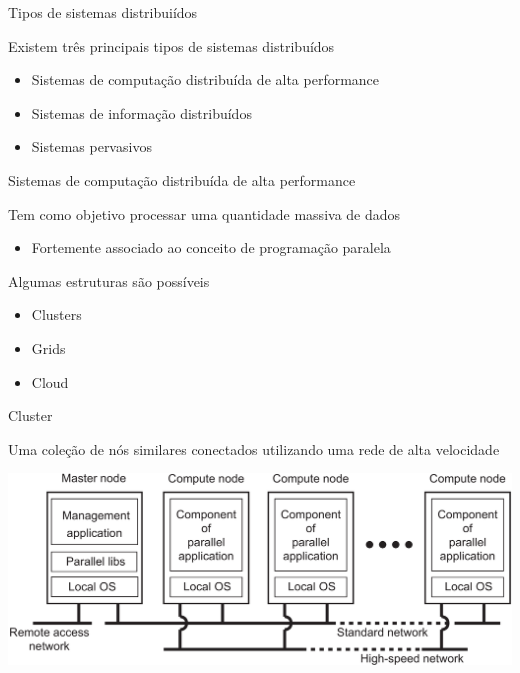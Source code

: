 \documentclass[compress]{beamer}
\begin{document}

\begin{frame}{Tipos de sistemas distribuiídos}

Existem três principais tipos de sistemas distribuídos

\begin{itemize}
    \item Sistemas de computação distribuída de alta performance
    \item Sistemas de informação distribuídos
    \item Sistemas pervasivos
\end{itemize}

\end{frame}


\begin{frame}{Sistemas de computação distribuída de alta performance}

Tem como objetivo processar uma quantidade massiva de dados
\begin{itemize}
    \item Fortemente associado ao conceito de programação paralela
\end{itemize}

\vspace{1cm}

Algumas estruturas são possíveis
\begin{itemize}
    \item Clusters
    \item Grids
    \item Cloud
\end{itemize}
\end{frame}


\begin{frame}{Cluster}

Uma coleção de nós similares conectados utilizando uma rede de alta velocidade

\vspace{1cm}

\centering \includegraphics[width=\textwidth]{images/cluster.png}

\end{frame}
\end{document}
